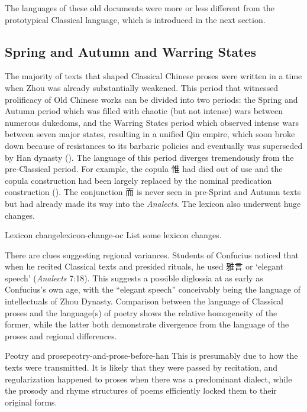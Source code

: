 \documentclass[UTF8, a4paper, oneside, scheme=plain, 12pt]{ctexrep}
\newcommand{\work}[1]{\textit{#1}}
\newcommand{\translate}[1]{`#1'}
\begin{document}
The languages of these old documents were more or less different from the prototypical Classical language,
which is introduced in the next section.

\subsection{Spring and Autumn and Warring States}\label{sec:intro.sprint-and-autumn}

The majority of texts that shaped Classical Chinese proses
were written in a time when Zhou was already substantially weakened.
This period that witnessed prolificacy of Old Chinese works
can be divided into two periods:
the Spring and Autumn period which was filled with chaotic (but not intense) wars between numerous dukedoms,
and the Warring States period which observed intense wars between seven major states,
resulting in a unified Qin empire,
which soon broke down because of resistances to its barbaric policies 
and eventually was superseded by Han dynasty ().
The language of this period diverges tremendously from the pre-Classical period.
For example, the copula 惟 had died out of use 
and the copula construction had been largely replaced by the nominal predication construction
().
The conjunction 而 is never seen in pre-Sprint and Autumn texts
but had already made its way into the \work{Analects}.
The lexicon also underwent huge changes.

\begin{todobox}{Lexicon change}{lexicon-change-oc}
    List some lexicon changes.
\end{todobox}

There are clues suggesting regional variances.
Students of Confucius noticed that when he recited Classical texts and presided rituals,
he used 雅言 or \translate{elegant speech} (\work{Analects} 7:18).
This suggests a possible diglossia at as early as Confucius's own age,
with the ``elegant speech'' conceivably being the language of intellectuals of Zhou Dynasty.
Comparison between the language of Classical proses and the language(s) of poetry
shows the relative homogeneity of the former,
while the latter both demonstrate divergence from the language of the proses
and regional differences.

\begin{todobox}{Peotry and prose}{peotry-and-prose-before-han}
    This is presumably due to how the texts were transmitted.
    It is likely that they were passed by recitation,
    and regularization happened to proses when there was a predominant dialect,
    while the prosody and rhyme structures of poems
    efficiently locked them to their original forms.
\end{todobox}
\end{document}
